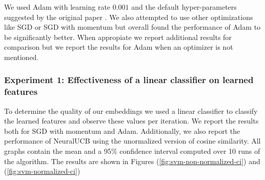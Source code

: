\documentclass{article}
\begin{document}
We used Adam with learning rate $0.001$ and the default hyper-parameters suggested by the original paper \cite{adam}.
We also attempted to use other optimizations like SGD or SGD with momentum but overall found the performance of Adam to be
significantly better.
When appropiate we report additional results for comparison but we report the results for Adam when an optimizer is not mentioned.

\subsubsection{Experiment 1: Effectiveness of a linear classifier on learned features}
To determine the quality of our embeddings we used a linear classifier to classify the learned features and observe these values
per iteration. We report the results both for SGD with momentum and Adam. Additionally, we also report the performance of NeuralUCB
using the unormalized version of cosine similarity. All graphs contain the mean and a 95\% confidence interval
computed over 10 runs of the algorithm. The results are shown in Figures (\ref{fig:svm-non-normalized-ci}) and (\ref{fig:svm-normalized-ci})
\end{document}
